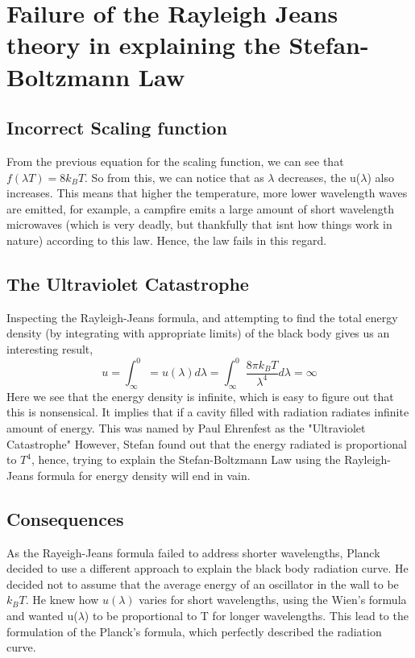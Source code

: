 \section{Failure of the Rayleigh Jeans theory in explaining the Stefan-Boltzmann Law}
\subsection{Incorrect Scaling function}
From the previous equation for the scaling function, we can see that $f(\lambda T)=8k_BT$. So from this, we can notice that as $\lambda$ decreases, the u($\lambda$) also increases. This means that higher the temperature, more lower wavelength waves are emitted, for example, a campfire emits a large amount of short wavelength microwaves (which is very deadly, but thankfully that isnt how things work in nature) according to this law. Hence, the law fails in this regard.

\subsection{The Ultraviolet Catastrophe}
Inspecting the Rayleigh-Jeans formula, and attempting to find the total energy density (by integrating with appropriate limits) of the black body gives us an interesting result,
\begin{equation}
	u=\int_{\infty}^{0}=u(\lambda)d\lambda=\int_{\infty}^{0}\frac{8\pi k_B T}{\lambda^4}d\lambda=\infty
\end{equation}
Here we see that the energy density is infinite, which is easy to figure out that this is nonsensical. It implies that if a cavity filled with radiation radiates infinite amount of energy. This was named by Paul Ehrenfest as the "Ultraviolet Catastrophe" However, Stefan found out that the energy radiated is proportional to $T^4$, hence, trying to explain the Stefan-Boltzmann Law using the Rayleigh-Jeans formula for energy density will end in vain.
\subsection{Consequences}
As the Rayeigh-Jeans formula failed to address shorter wavelengths, Planck decided to use a different approach to explain the black body radiation curve. He decided not to assume that the average energy of an oscillator in the wall to be $k_BT$. He knew how $u(\lambda)$ varies for short wavelengths, using the Wien's formula and wanted u($\lambda$) to be proportional to T for longer wavelengths. This lead to the formulation of the Planck's formula, which perfectly described the radiation curve.